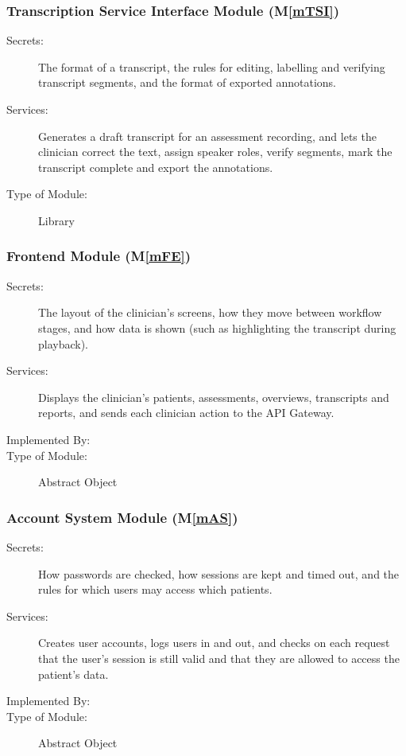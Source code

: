 \documentclass[12pt, titlepage]{article}
\newcommand{\mref}[1]{M\ref{#1}}
\begin{document}
\subsubsection{Transcription Service Interface Module (\mref{mTSI})}
\begin{description}
\item[Secrets:]The format of a transcript, the rules for editing, labelling and verifying transcript segments, and the format of exported annotations.
\item[Services:]Generates a draft transcript for an assessment recording, and lets the clinician correct the text, assign speaker roles, verify segments, mark the transcript complete and export the annotations. 
\item[Type of Module:] Library
\end{description}

\subsubsection{Frontend Module (\mref{mFE})}
\begin{description}
\item[Secrets:]The layout of the clinician's screens, how they move between workflow stages, and how data is shown (such as highlighting the transcript during playback).
\item[Services:]Displays the clinician's patients, assessments, overviews, transcripts and reports, and sends each clinician action to the API Gateway.
\item[Implemented By:] \progname{}
\item[Type of Module:] Abstract Object
\end{description}

\subsubsection{Account System Module (\mref{mAS})}
\begin{description}
\item[Secrets:]How passwords are checked, how sessions are kept and timed out, and the rules for which users may access which patients.
\item[Services:]Creates user accounts, logs users in and out, and checks on each request that the user's session is still valid and that they are allowed to access the patient's data.
\item[Implemented By:] \progname{}
\item[Type of Module:] Abstract Object
\end{description}
\end{document}
